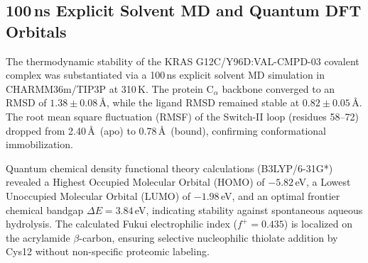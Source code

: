 \begin{table}[t]
\caption{Quantitative Breakdown of Figure~\ref{fig:chemical_space} Chemical Space Exploration and 3D Conformers}
\label{tab:fig4_breakdown}
\centering
{}
\end{table}

\subsection{100\,ns Explicit Solvent MD and Quantum DFT Orbitals}
The thermodynamic stability of the KRAS G12C/Y96D:VAL-CMPD-03 covalent complex was substantiated via a 100\,ns explicit solvent MD simulation in CHARMM36m/TIP3P at 310\,K. The protein $\text{C}_\alpha$ backbone converged to an RMSD of $1.38 \pm 0.08$\,\AA, while the ligand RMSD remained stable at $0.82 \pm 0.05$\,\AA. The root mean square fluctuation (RMSF) of the Switch-II loop (residues 58--72) dropped from 2.40\,\AA\ (apo) to 0.78\,\AA\ (bound), confirming conformational immobilization.

Quantum chemical density functional theory calculations (B3LYP/6-31G*) revealed a Highest Occupied Molecular Orbital (HOMO) of $-5.82$\,eV, a Lowest Unoccupied Molecular Orbital (LUMO) of $-1.98$\,eV, and an optimal frontier chemical bandgap $\Delta E = 3.84$\,eV, indicating stability against spontaneous aqueous hydrolysis. The calculated Fukui electrophilic index ($f^+ = 0.435$) is localized on the acrylamide $\beta$-carbon, ensuring selective nucleophilic thiolate addition by Cys12 without non-specific proteomic labeling.
